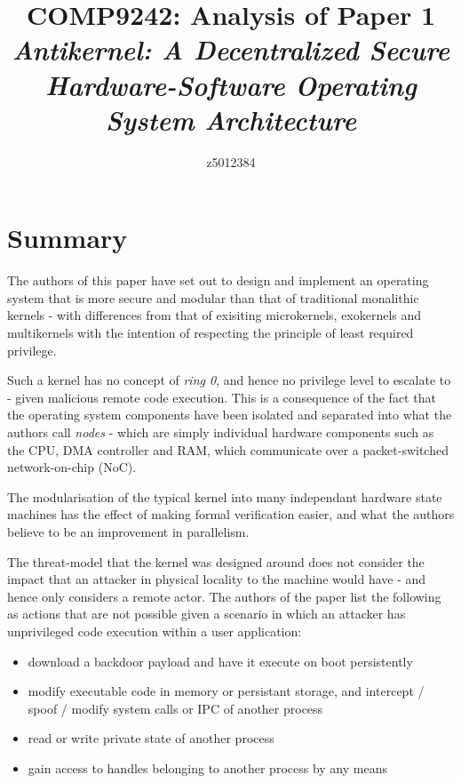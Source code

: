 \documentclass{article}
\begin{document}
\title{COMP9242: Analysis of Paper 1 \\ \vspace{0.75cm} \large \textit{Antikernel: A Decentralized Secure Hardware-Software Operating System Architecture}}

\author{z5012384}

\maketitle

\section*{Summary}
The authors of this paper have set out to design and implement an operating system that is more secure and modular than that of traditional monalithic kernels - with differences from that of exisiting microkernels, exokernels and multikernels with the intention of respecting the principle of least required privilege.

Such a kernel has no concept of \textit{ring 0}, and hence no privilege level to escalate to - given malicious remote code execution. This is a consequence of the fact that the operating system components have been isolated and separated into what the authors call \textit{nodes} - which are simply individual hardware components such as the CPU, DMA controller and RAM, which communicate over a packet-switched network-on-chip (NoC).

The modularisation of the typical kernel into many independant hardware state machines has the effect of making formal verification easier, and what the authors believe to be an improvement in parallelism.

The threat-model that the kernel was designed around does not consider the impact that an attacker in physical locality to the machine would have - and hence only considers a remote actor. The authors of the paper list the following as actions that are not possible given a scenario in which an attacker has unprivileged code execution within a user application:
\begin{itemize}
\item download a backdoor payload and have it execute on boot persistently
\item modify executable code in memory or persistant storage, and intercept / spoof / modify system calls or IPC of another process
\item read or write private state of another process
\item gain access to handles belonging to another process by any means
\end{itemize}
\end{document}
